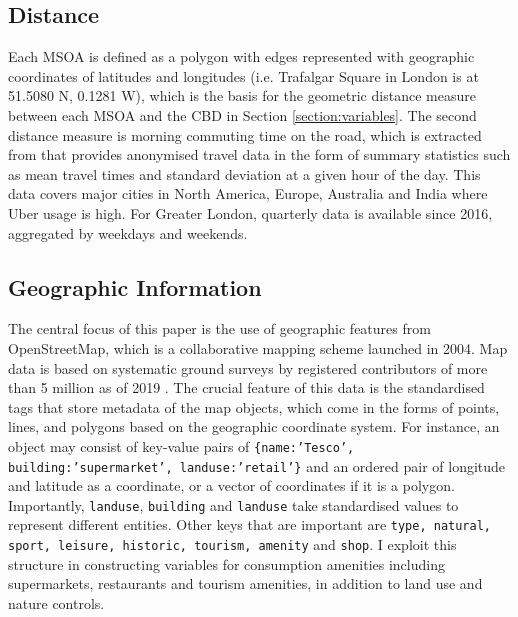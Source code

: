 \documentclass{article}
\begin{document}
\subsection{Distance}
Each MSOA is defined as a polygon with edges represented with geographic coordinates of latitudes and longitudes (i.e. Trafalgar Square in London is at 51.5080 N, 0.1281 W), which is the basis for the geometric distance measure between each MSOA and the CBD in Section \ref{section:variables}. The second distance measure is morning commuting time on the road, which is extracted from \citet{UberMovement2019MovementCities} that provides anonymised travel data in the form of summary statistics such as mean travel times and standard deviation at a given hour of the day. This data covers major cities in North America, Europe, Australia and India where Uber usage is high. For Greater London, quarterly data is available since 2016, aggregated by weekdays and weekends.

\subsection{Geographic Information}
The central focus of this paper is the use of geographic features from OpenStreetMap, which is a collaborative mapping scheme launched in 2004. Map data is based on systematic ground surveys by registered contributors of more than 5 million as of 2019 \citep{OpenStreetMap2019Contributors}. The crucial feature of this data is the standardised tags that store metadata of the map objects, which come in the forms of points, lines, and polygons based on the geographic coordinate system. For instance, an object may consist of key-value pairs of \texttt{\{name:'Tesco', building:'supermarket', landuse:'retail'\}} and an ordered pair of longitude and latitude as a coordinate, or a vector of coordinates if it is a polygon. Importantly, \texttt{landuse}, \texttt{building} and \texttt{landuse} take standardised values to represent different entities. Other keys that are important are \texttt{type, natural, sport, leisure, historic, tourism, amenity} and \texttt{shop}. I exploit this structure in constructing variables for consumption amenities including supermarkets, restaurants and tourism amenities, in addition to land use and nature controls.
\end{document}
